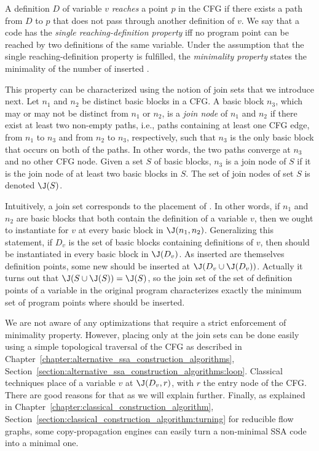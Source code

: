 A definition $D$ of variable $v$ \emph{reaches} a point $p$ in the CFG if there exists a path from $D$ to $p$ that does not pass through another definition of $v$. 
We say that a code has the \emph{single reaching-definition property} iff no program point can be reached by two definitions of the same variable. 
Under the assumption that the single reaching-definition property is fulfilled, the \emph{minimality property} states the minimality of the number of inserted \phifuns.

This property can be characterized using the notion of join sets that we introduce next. 
Let $n_{1}$ and $n_{2}$ be distinct basic blocks in a CFG. 
A basic block $n_{3}$, which may or may not be distinct from $n_{1}$ or $n_{2}$, is a \emph{join node} of $n_{1}$ and $n_{2}$ if there exist at least two non-empty paths, i.e., paths containing at least one CFG edge, from $n_{1}$ to $n_{3}$ and from $n_{2}$ to $n_{3}$, respectively, such that $n_{3}$ is the only basic block that occurs on both of the paths. 
In other words, the two paths converge at $n_{3}$ and no other CFG node. 
Given a set $S$ of basic blocks, $n_{3}$ is a join node of $S$ if it is the join node of at least two basic blocks in $S$. 
The set of join nodes of set $S$ is denoted $\J(S)$.

Intuitively, a join set corresponds to the placement of \phifuns. 
In other words, if $n_{1}$ and $n_{2}$ are basic blocks that both contain the definition of a variable $v$, then we ought to instantiate \phifuns for $v$ at every basic block in $\J(n_{1}, n_{2})$. 
Generalizing this statement, if $D_v$ is the set of basic blocks containing definitions of $v$, then \phifuns should be instantiated in every basic block in $\J(D_v)$. 
As inserted \phifuns are themselves definition points, some new \phifuns should be inserted at $\J(D_v\cup\J(D_v))$. 
Actually it turns out that $\J(S\cup\J(S))=\J(S)$, so the join set of the set of definition points of a variable in the original program characterizes exactly the minimum set of program points where \phifuns should be inserted.

We are not aware of any optimizations that require a strict enforcement of minimality property. 
However, placing \phifuns only at the join sets can be done easily using a simple topological traversal of the CFG as described in Chapter~\ref{chapter:alternative_ssa_construction_algorithms}, Section~\ref{section:alternative_ssa_construction_algorithms:loop}. 
Classical techniques place \phifuns of a variable $v$ at $\J(D_v,r)$, with $r$ the entry node of the CFG. 
There are good reasons for that as we will explain further. 
Finally, as explained in Chapter~\ref{chapter:classical_construction_algorithm}, Section~\ref{section:classical_construction_algorithm:turning} for reducible flow graphs, some copy-propagation engines can easily turn a non-minimal SSA code into a minimal one.

